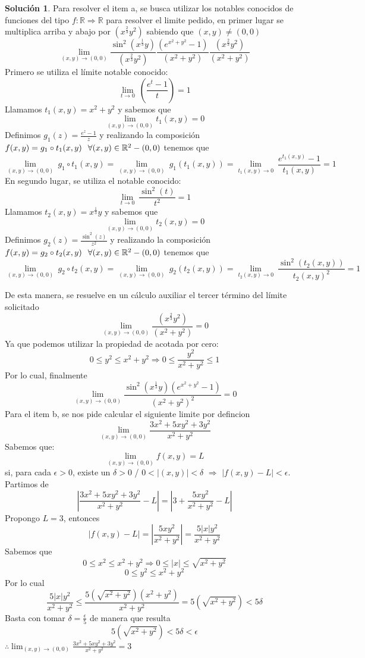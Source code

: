 \documentclass[10pt, a4paper]{report}
\renewcommand{\Re}{\mathbb {R}}
\theoremstyle{definition} %
\newtheorem{solution}{Solución}
\begin{document}
\begin{solution}
    Para resolver el item a, se busca utilizar los notables conocidos de funciones del tipo $f:\Re\Rightarrow\Re$ para resolver el limite pedido, en primer lugar se multiplica arriba y abajo por $(x^{\frac{2}{3}}y^2)$ sabiendo que $(x,y)\neq(0,0)$
    \[
        \lim_{(x,y)\to(0,0)} \frac{\sin^2{(x^{\frac{1}{3}}y)}}{(x^{\frac{2}{3}}y^2)}\frac{(e^{x^2+y^2}-1)}{(x^2+y^2)}\frac{(x^{\frac{2}{3}}y^2)}{(x^2+y^2)}
    \]
Primero se utiliza el límite notable conocido:    
\[
        \lim_{t\to 0} \
        (\frac{e^{t}-1}{t})=1
    \]
    Llamamos  $t_1(x,y)=x^{2}+y^{2}$ y sabemos que 
   \[
        \lim_{(x,y)\to(0,0)} t_1(x,y)=0
    \]
    Definimos $g_1(z)=\frac{e^{z}-1}{z} $ y realizando la composición $f(x,y)=g_1\circ t_1(x,y) \hspace{0.25cm}\forall (x,y)\in \mathbb{R}^ 2 -(0,0)$ tenemos que
\[
        \lim_{(x,y)\to (0,0)} \
        g_1\circ t_1(x,y)=\lim_{(x,y)\to (0,0)} \
        g_1(t_1(x,y))=\lim_{t_1(x,y)\to 0} \
        \frac{e^{t_1(x,y)}-1}{t_1(x,y)}=1
    \]
En segundo lugar, se utiliza el notable conocido: 
\[
        \lim_{t\to 0} \
        \frac{\sin^2{(t)}}{t^2}=1
 \]
  Llamamos  $t_2(x,y)=x^{\frac{1}{3}}y$ y sabemos que 
   \[
        \lim_{(x,y)\to(0,0)} t_2(x,y)=0
    \]
    Definimos $g_2(z)=\frac{\sin^2{(z)}}{z^2} $ y realizando la composición $f(x,y)=g_2\circ t_2(x,y) \hspace{0.25cm}\forall (x,y)\in \mathbb{R}^ 2 -(0,0)$ tenemos que
\[
        \lim_{(x,y)\to (0,0)} \
        g_2\circ t_2(x,y)=\lim_{(x,y)\to (0,0)} \
        g_2(t_2(x,y))=\lim_{t_2(x,y)\to 0} \
        \frac{\sin^2{(t_2(x,y))}}{t_2(x,y)^2}=1
    \]

    De esta manera, se resuelve en un cálculo auxiliar el tercer término del límite solicitado
\[
        \lim_{(x,y)\to(0,0)} \frac{(x^{\frac{2}{3}}y^2)}{(x^2+y^2)}=0
    \]
Ya que podemos utilizar la propiedad de acotada por cero:
\[
        0\le y^2\le x^2+y^2    \Rightarrow   0\le \frac{y^2}{x^2+y^2}\le 1
    \]
Por lo cual, finalmente
\[
        \lim_{(x,y)\to(0,0)} \frac{\sin^2{(x^{\frac{1}{3}}y)}(e^{x^2+y^2}-1)}{(x^2+y^2)^2}=0
    \]
\newpage
Para el item b, se nos pide calcular el siguiente limite por defincion
\[
        \lim_{(x,y)\to(0,0)} \frac{3x^2+5xy^2+3y^2}{x^2+y^2}
    \]
Sabemos que:
\[
\lim_{(x,y) \to (0,0)} f(x,y) = L
\]
si, para cada \( \epsilon > 0 \), existe un \( \delta > 0 \) / \( 0 < |(x,y)| < \delta \) $\Rightarrow$ \( |f(x,y) - L| < \epsilon \).
Partimos de 
\[
|\frac{3x^2+5xy^2+3y^2}{x^2+y^2}-L|=|3+\frac{5xy^2}{x^2+y^2}-L|
\]
Propongo $L=3$, entonces
\[
|f(x,y) - L|=|\frac{5xy^2}{x^2+y^2}|=\frac{5|x|y^2}{x^2+y^2}
\]
Sabemos que 
\[
0\le x^2\le x^2+y^2 \Rightarrow 0\le |x|\le \sqrt{x^2+y^2 }
\]
\[
0\le y^2\le x^2+y^2
\]
Por lo cual
\[
\frac{5|x|y^2}{x^2+y^2} \le \frac{5(\sqrt{x^2+y^2})(x^2+y^2)}{x^2+y^2}=5(\sqrt{x^2+y^2})<5\delta
\]
Basta con tomar $\delta=\frac{\epsilon}{5}$ de manera que resulta
\[
5(\sqrt{x^2+y^2})<5\delta<\epsilon
\]
$\therefore  \lim_{(x,y)\to(0,0)} \frac{3x^2+5xy^2+3y^2}{x^2+y^2}=3$ 
\end{solution}
\newpage
\end{document}

